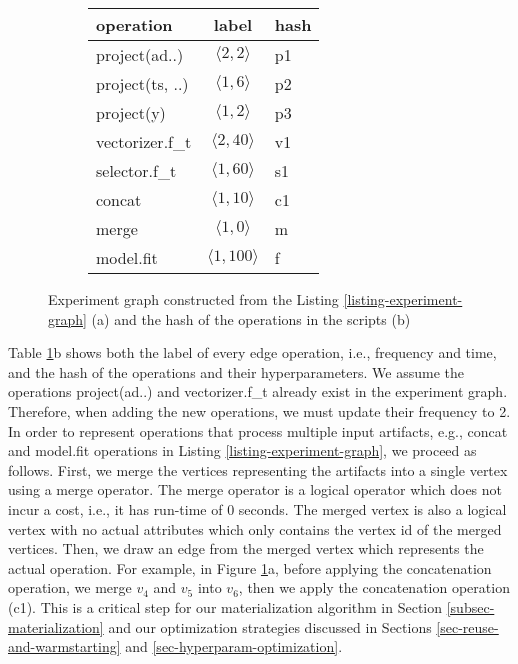 \begin{figure}
\begin{subfigure}[b]{0.4\linewidth}
\centering

\caption{}
\end{subfigure}%
\begin{subfigure}[b]{0.6\linewidth}
\begin{tabular}{lcl}
\hline
operation & label &  hash \\
\hline
project(ad..) & $\langle 2, 2\rangle$ &p1 \\
project(ts, ..) & $\langle 1, 6\rangle$ & p2\\
project(y) & $\langle 1, 2\rangle$ & p3\\
vectorizer.f\_t & $\langle 2, 40\rangle$ & v1 \\
selector.f\_t & $\langle 1, 60\rangle$ & s1 \\
concat & $\langle 1, 10\rangle$ & c1 \\
merge & $\langle 1, 0 \rangle$ & m\\
model.fit & $\langle 1, 100\rangle$ & f\\
\hline
\end{tabular}
\caption{}
\end{subfigure}
\caption{Experiment graph constructed from the Listing \ref{listing-experiment-graph} (a) and the hash of the operations in the scripts (b)}
\label{fig-experiment-graph}
\end{figure}
Table \ref{fig-experiment-graph}b shows both the label of every edge operation, i.e., frequency and time, and the hash of the operations and their hyperparameters.
We assume the operations project(ad..) and vectorizer.f\_t already exist in the experiment graph.
Therefore, when adding the new operations, we must update their frequency to 2.
In order to represent operations that process multiple input artifacts, e.g., concat and model.fit operations in Listing \ref{listing-experiment-graph}, we proceed as follows.
First, we merge the vertices representing the artifacts into a single vertex using a merge operator.
The merge operator is a logical operator which does not incur a cost, i.e., it has run-time of 0 seconds.
The merged vertex is also a logical vertex with no actual attributes which only contains the vertex id of the merged vertices.
Then, we draw an edge from the merged vertex which represents the actual operation.
For example, in Figure \ref{fig-experiment-graph}a, before applying the concatenation operation, we merge $v_4$ and $v_5$ into $v_6$, then we apply the concatenation operation (c1).
This is a critical step for our materialization algorithm in Section \ref{subsec-materialization} and our optimization strategies discussed in Sections \ref{sec-reuse-and-warmstarting} and \ref{sec-hyperparam-optimization}.


